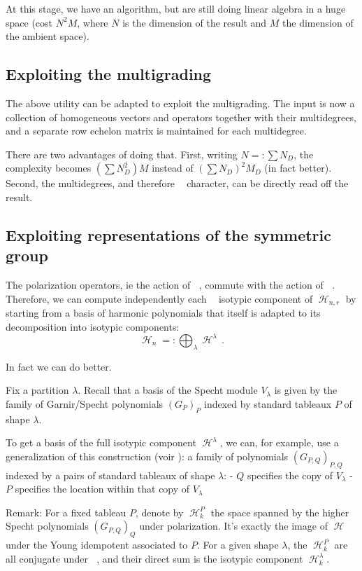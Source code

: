 \documentclass[letter,12pt]{article}
\DeclareMathOperator{\Sn}{\mathbb{S}_n}
\DeclareMathOperator{\GLr}{GL_r}
\DeclareMathOperator{\harmonics}{\mathcal{H}}
\begin{document}
	At this stage, we have an algorithm, but are still doing linear algebra in a huge space (cost $N^2 M$, where $N$ is the dimension of the result and $M$ the dimension of the ambient space).
	
	\subsection{Exploiting the multigrading}
	
	The above utility can be adapted to exploit the multigrading. The input is now a collection of homogeneous vectors and operators together with their multidegrees, and a separate row echelon matrix is maintained for each multidegree.
	
	There are two advantages of doing that. 
	First, writing $N=:\sum N_D$, the complexity becomes $(\sum N_D^2) M$ instead of $(\sum N_D)^2M_D$ (in fact better).
	Second, the multidegrees, and therefore $\GLr$ character, can be directly read off the result.
	
	\subsection{Exploiting representations of the symmetric group}
	
	The polarization operators, ie the action of $\GLr$, commute with the action of $\Sn$. Therefore, we can compute independently each $\Sn$ isotypic component of $\harmonics_{n,r}$ by starting from a basis of harmonic polynomials that itself is adapted to its decomposition into isotypic components:
	$$\harmonics_{n}=:\bigoplus_\lambda \harmonics^\lambda\,.$$
	
	In fact we can do better.
	
	Fix a partition $\lambda$. Recall that a basis of the Specht module $V_\lambda$ is given by the family of Garnir/Specht polynomials $(G_{P})_P$ indexed by standard tableaux $P$ of shape $\lambda$.
	
	To get a basis of the full isotypic component $\harmonics^\lambda$, we can, for example, use a generalization of this construction (voir \cite{Ariki1997}): a family of polynomials $(G_{P,Q})_{P,Q}$ indexed by a pairs of standard tableaux of shape $\lambda$:
	- $Q$ specifies the copy of $V_\lambda$
	- $P$ specifies the location within that copy of $V_\lambda$
	
	
	Remark: For a fixed tableau $P$, denote by $\harmonics_k^P$ the space spanned by the higher Specht polynomials $(G_{P,Q})_Q$ under polarization. It's exactly the image of $\harmonics$ under the Young idempotent associated to $P$. For a given shape $\lambda$, the $\harmonics_k^P$ are all conjugate under $\Sn$, and their direct sum is the isotypic component $\harmonics_k^\lambda$.
	
\end{document}
